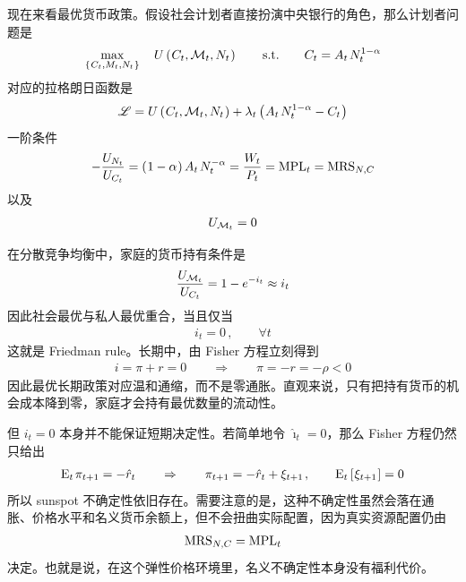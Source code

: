 
现在来看最优货币政策。假设社会计划者直接扮演中央银行的角色，那么计划者问题是
\begin{align*}
    \max_{\bkd{C_t,M_t,N_t}}\quad U\bka{C_t,\cal M_t,N_t}
    \qquad\text{s.t.}\qquad
    C_t=A_t\,N_t^{1-\alpha}
\end{align*}
对应的拉格朗日函数是
\begin{align*}
    \scr L=U\bka{C_t,\cal M_t,N_t}+\lambda_t\bka{A_t\,N_t^{1-\alpha}-C_t}
\end{align*}
一阶条件
\begin{align*}
    -\dfrac{U_{N_t}}{U_{C_t}}
    =\bka{1-\alpha}A_t\,N_t^{-\alpha}
    =\dfrac{W_t}{P_t}
    =\n{MPL}_t
    =\n{MRS}_{N,C}
\end{align*}
以及
\begin{align*}
    U_{\cal M_t}=0
\end{align*}

\myskip
{}

在分散竞争均衡中，家庭的货币持有条件是
\begin{align*}
    \dfrac{U_{\cal M_t}}{U_{C_t}}=1-e^{-i_t}\approx i_t
\end{align*}
因此社会最优与私人最优重合，当且仅当
\begin{align*}
    i_t=0\,,\qquad \forall t
\end{align*}
这就是 Friedman rule。长期中，由 Fisher 方程立刻得到
\begin{align*}
    i=\pi+r=0
    \qquad\Rightarrow\qquad
    \pi=-r=-\rho<0
\end{align*}
因此最优长期政策对应温和通缩，而不是零通胀。直观来说，只有把持有货币的机会成本降到零，家庭才会持有最优数量的流动性。

\myskip
{}

但 \(i_t=0\) 本身并不能保证短期决定性。若简单地令 \(\hat\imath_t=0\)，那么 Fisher 方程仍然只给出
\begin{align*}
    \meant\,\pi\nt=-\hat r_t
    \qquad\Rightarrow\qquad
    \pi\nt=-\hat r_t+\xi_{t+1}\,,\qquad \meant\bks{\xi_{t+1}}=0
\end{align*}
所以 sunspot 不确定性依旧存在。需要注意的是，这种不确定性虽然会落在通胀、价格水平和名义货币余额上，但不会扭曲实际配置，因为真实资源配置仍由
\begin{align*}
    \text{MRS}_{N,C}=\text{MPL}_t
\end{align*}
决定。也就是说，在这个弹性价格环境里，名义不确定性本身没有福利代价。

